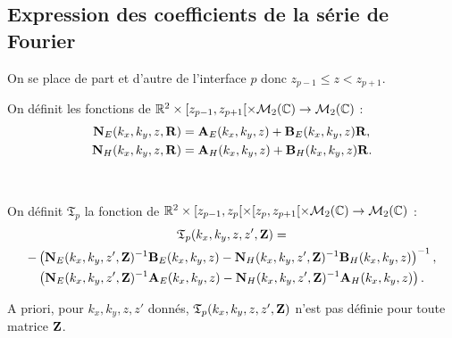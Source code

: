 \subsection{Expression des coefficients de la série de Fourier}

    On se place de part et d'autre de l'interface \(p\) donc \(z_{p-1} \le z < z_{p+1} \).

    \begin{defn}
      \label{def:plan:matrices_NE-NH}
      On définit les fonctions de \(\mathbb R^2 \times [z_{p-1},z_{p+1}[ \times \mathcal{M}_{2}(\mathbb C) \rightarrow \mathcal{M}_{2}(\mathbb C)\) :
      \begin{align*}
        \mathbf{N}_{E}(k_x,k_y,z,\mathbf{R}) &= \mathbf{A}_{E}(k_x,k_y,z) + \mathbf{B}_{E}(k_x,k_y,z)\mathbf{R},
        \\
        \mathbf{N}_{H}(k_x,k_y,z,\mathbf{R}) &= \mathbf{A}_{H}(k_x,k_y,z) + \mathbf{B}_{H}(k_x,k_y,z)\mathbf{R}.
      \end{align*}
    \end{defn}

    \begin{defn}%
      \label{def:plan:transfert:reflexion}{}~

      On définit \(\mathfrak{T}_p\) la fonction de \(\mathbb R^2 \times [z_{p-1}, z_p[\times[z_p, z_{p+1}[\times\mathcal{M}_2(\mathbb C)\rightarrow \mathcal{M}_{2}(\mathbb C)\) :
      \begin{multline*}
        \mathfrak{T}_p(k_x,k_y,z,z',\mathbf{Z}) = \\
          -\left(\mathbf{N}_{E}(k_x,k_y,z',\mathbf{Z})^{-1}\mathbf{B}_{E}(k_x,k_y,z) - \mathbf{N}_{H}(k_x,k_y,z',\mathbf{Z})^{-1}\mathbf{B}_{H}(k_x,k_y,z)\right)^{-1},
          \\
          \left(\mathbf{N}_{E}(k_x,k_y,z',\mathbf{Z})^{-1}\mathbf{A}_{E}(k_x,k_y,z) - \mathbf{N}_{H}(k_x,k_y,z',\mathbf{Z})^{-1}\mathbf{A}_{H}(k_x,k_y,z)\right).
      \end{multline*}
    \end{defn}
    A priori, pour \(k_x,k_y,z,z'\) donnés, \(\mathfrak{T}_p(k_x,k_y,z,z',\mathbf{Z})\) n'est pas définie pour toute matrice \(\mathbf{Z}\).

